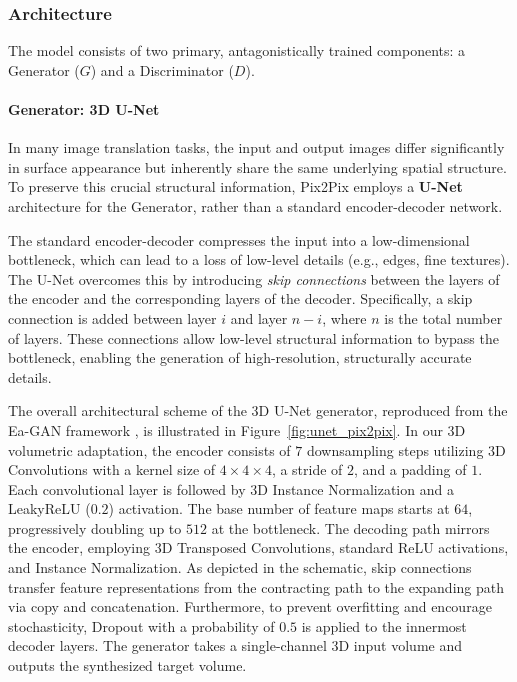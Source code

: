 \documentclass[11pt,a4paper]{article}
\begin{document}
\subsubsection{Architecture}
The model consists of two primary, antagonistically trained components: a Generator ($G$) and a Discriminator ($D$).

\paragraph{Generator: 3D U-Net}
In many image translation tasks, the input and output images differ significantly in surface appearance but inherently share the same underlying spatial structure. To preserve this crucial structural information, Pix2Pix employs a \textbf{U-Net} architecture for the Generator, rather than a standard encoder-decoder network. 

The standard encoder-decoder compresses the input into a low-dimensional bottleneck, which can lead to a loss of low-level details (e.g., edges, fine textures). The U-Net overcomes this by introducing \textit{skip connections} between the layers of the encoder and the corresponding layers of the decoder. Specifically, a skip connection is added between layer $i$ and layer $n-i$, where $n$ is the total number of layers. These connections allow low-level structural information to bypass the bottleneck, enabling the generation of high-resolution, structurally accurate details.

The overall architectural scheme of the 3D U-Net generator, reproduced from the Ea-GAN framework \cite{yu2019}, is illustrated in Figure~\ref{fig:unet_pix2pix}. In our 3D volumetric adaptation, the encoder consists of $7$ downsampling steps utilizing 3D Convolutions with a kernel size of $4 \times 4 \times 4$, a stride of $2$, and a padding of $1$. Each convolutional layer is followed by 3D Instance Normalization and a LeakyReLU ($0.2$) activation. The base number of feature maps starts at $64$, progressively doubling up to $512$ at the bottleneck. The decoding path mirrors the encoder, employing 3D Transposed Convolutions, standard ReLU activations, and Instance Normalization. As depicted in the schematic, skip connections transfer feature representations from the contracting path to the expanding path via copy and concatenation. Furthermore, to prevent overfitting and encourage stochasticity, Dropout with a probability of $0.5$ is applied to the innermost decoder layers. The generator takes a single-channel 3D input volume and outputs the synthesized target volume.
\end{document}
